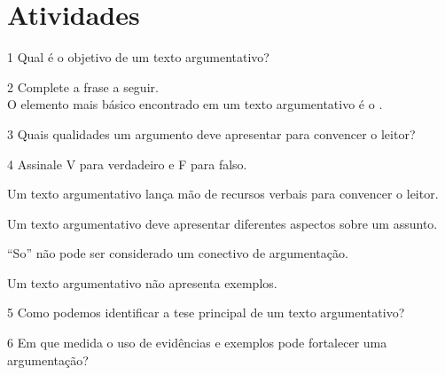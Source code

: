 \section{Atividades}

\num{1} Qual é o objetivo de um texto argumentativo?



\num{2} Complete a frase a seguir.\\
O elemento mais básico encontrado em um texto argumentativo é o \preencher.


\num{3} Quais qualidades um argumento deve apresentar para convencer o leitor?



\num{4} Assinale V para verdadeiro e F para falso.

\begin{boxlist}
\item Um texto argumentativo lança mão de recursos verbais para
convencer o leitor. 

\item Um texto argumentativo deve apresentar diferentes aspectos sobre
um assunto. 

\item ``So'' não pode ser considerado um conectivo de argumentação. 

\item Um texto argumentativo não apresenta exemplos. 
\end{boxlist}

\num{5} Como podemos identificar a tese principal de um texto argumentativo?



\num{6} Em que medida o uso de evidências e exemplos pode fortalecer uma argumentação?



